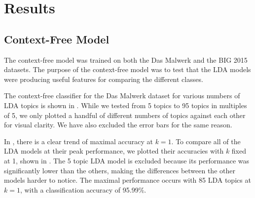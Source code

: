\documentclass[../stegner_thesis.tex]{subfiles}
\begin{document}
\chapter{Results}%
\label{ch:results}

\section{Context-Free Model}%
\label{sec:res_context_free}

\par The context-free model was trained on both the Das Malwerk and the BIG
2015 datasets.
The purpose of the context-free model was to test that the LDA models were
producing useful features for comparing the different classes.

\par The context-free classifier for the Das Malwerk dataset for various
numbers of LDA topics is shown in .
While we tested from 5 topics to 95 topics in multiples of 5, we only plotted
a handful of different numbers of topics against each other for visual clarity.
We have also excluded the error bars for the same reason.
\par In , there is a clear trend of maximal
accuracy at $k=1$.
To compare all of the LDA models at their peak performance, we plotted their
accuracies with $k$ fixed at 1, shown in .
The 5 topic LDA model is excluded because its performance was significantly
lower than the others, making the differences between the other models harder
to notice.
The maximal performance occurs with 85 LDA topics at $k=1$, with a
classification accuracy of 95.99\%.
\end{document}
